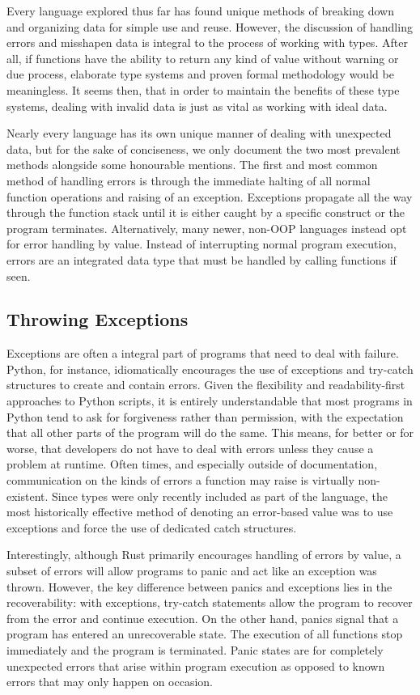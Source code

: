 \documentclass{article}
\begin{document}
Every language explored thus far has found unique methods of breaking down and organizing data for simple use and reuse.
However, the discussion of handling errors and misshapen data is integral to the process of working with types.
After all, if functions have the ability to return any kind of value without warning or due process,
elaborate type systems and proven formal methodology would be meaningless. It seems then, that in order to
maintain the benefits of these type systems, dealing with invalid data is just as vital as working with ideal data.

Nearly every language has its own unique manner of dealing with unexpected data, but for the sake of conciseness,
we only document the two most prevalent methods alongside some honourable mentions. The first and most common
method of handling errors is through the immediate halting of all normal function operations and raising of an exception.
Exceptions propagate all the way through the function stack until it is either caught by a specific construct
or the program terminates. Alternatively, many newer, non-OOP languages instead opt for error handling by value.
Instead of interrupting normal program execution, errors are an integrated data type
that must be handled by calling functions if seen.

\subsection{Throwing Exceptions}

Exceptions are often a integral part of programs that need to deal with failure. Python, for instance, idiomatically
encourages the use of exceptions and try-catch structures to create and contain errors.
Given the flexibility and readability-first approaches to Python scripts, it is entirely understandable that
most programs in Python tend to ask for forgiveness rather than permission, with the expectation that all other parts of
the program will do the same. This means, for better or for worse, that developers do not have to deal with errors
unless they cause a problem at runtime. Often times, and especially outside of documentation,
communication on the kinds of errors a function may raise is virtually non-existent.
Since types were only recently included as part of the language, the most historically effective method of
denoting an error-based value was to use exceptions and force the use of dedicated catch structures.

Interestingly, although Rust primarily encourages handling of errors by value, a subset of errors will allow programs
to panic and act like an exception was thrown. However, the key difference between panics and exceptions
lies in the recoverability: with exceptions, try-catch statements allow the program to recover
from the error and continue execution. On the other hand, panics signal that a program has entered an unrecoverable state.
The execution of all functions stop immediately and the program is terminated.
Panic states are for completely unexpected errors that arise within program execution as opposed to known errors
that may only happen on occasion.
\end{document}
